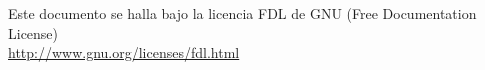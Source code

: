 \documentclass[a4paper,12pt]{article}
\begin{document}



\vspace{0.75cm}

\begin{center}
{\footnotesize Este documento se halla bajo la licencia FDL de GNU (Free Documentation
  License)\\ \url{http://www.gnu.org/licenses/fdl.html} }
\end{center}
\end{document}
